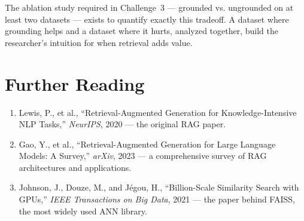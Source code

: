 The ablation study required in Challenge~3 — grounded vs. ungrounded on at least two datasets — exists to quantify exactly this tradeoff.
A dataset where grounding helps and a dataset where it hurts, analyzed together, build the researcher's intuition for when retrieval adds value.

\section*{Further Reading}

\begin{small}
\begin{enumerate}
\item Lewis, P., et al., ``Retrieval-Augmented Generation for Knowledge-Intensive NLP Tasks,'' \emph{NeurIPS}, 2020 — the original RAG paper.
\item Gao, Y., et al., ``Retrieval-Augmented Generation for Large Language Models: A Survey,'' \emph{arXiv}, 2023 — a comprehensive survey of RAG architectures and applications.
\item Johnson, J., Douze, M., and Jégou, H., ``Billion-Scale Similarity Search with GPUs,'' \emph{IEEE Transactions on Big Data}, 2021 — the paper behind FAISS, the most widely used ANN library.
\end{enumerate}
\end{small}

